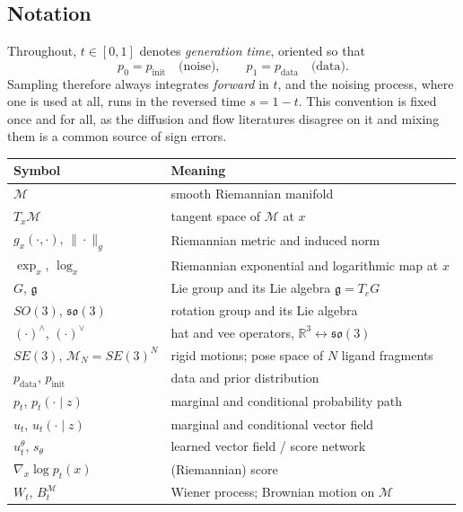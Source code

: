 \documentclass[a4paper,12pt]{article}
\theoremstyle{remark}
\begin{document}
\subsection{Notation}
\label{sec:notation}

Throughout, $t\in[0,1]$ denotes \emph{generation time}, oriented so that
\[
p_0=p_{\mathrm{init}}
\quad\text{(noise)},
\qquad
p_1=p_{\mathrm{data}}
\quad\text{(data)} .
\]
Sampling therefore always integrates \emph{forward} in $t$, and the noising process,
where one is used at all, runs in the reversed time $s=1-t$. This convention is fixed
once and for all, as the diffusion and flow literatures disagree on it and mixing them
is a common source of sign errors.

\begin{center}
\begin{tabular}{ll}
\toprule
Symbol & Meaning \\
\midrule
$\mathcal M$ & smooth Riemannian manifold \\
$T_x\mathcal M$ & tangent space of $\mathcal M$ at $x$ \\
$g_x(\cdot,\cdot)$, $\|\cdot\|_g$ & Riemannian metric and induced norm \\
$\exp_x$, $\log_x$ & Riemannian exponential and logarithmic map at $x$ \\
$G$, $\mathfrak g$ & Lie group and its Lie algebra $\mathfrak g=T_eG$ \\
$SO(3)$, $\mathfrak{so}(3)$ & rotation group and its Lie algebra \\
$(\cdot)^\wedge$, $(\cdot)^\vee$ & hat and vee operators, $\mathbb R^3\leftrightarrow\mathfrak{so}(3)$ \\
$SE(3)$, $\mathcal M_N=SE(3)^N$ & rigid motions; pose space of $N$ ligand fragments \\
$p_{\mathrm{data}}$, $p_{\mathrm{init}}$ & data and prior distribution \\
$p_t$, $p_t(\cdot\mid z)$ & marginal and conditional probability path \\
$u_t$, $u_t(\cdot\mid z)$ & marginal and conditional vector field \\
$u_t^\theta$, $s_\theta$ & learned vector field / score network \\
$\nabla_x\log p_t(x)$ & (Riemannian) score \\
$W_t$, $B_t^{\mathcal M}$ & Wiener process; Brownian motion on $\mathcal M$ \\
\bottomrule
\end{tabular}
\end{center}
\end{document}
